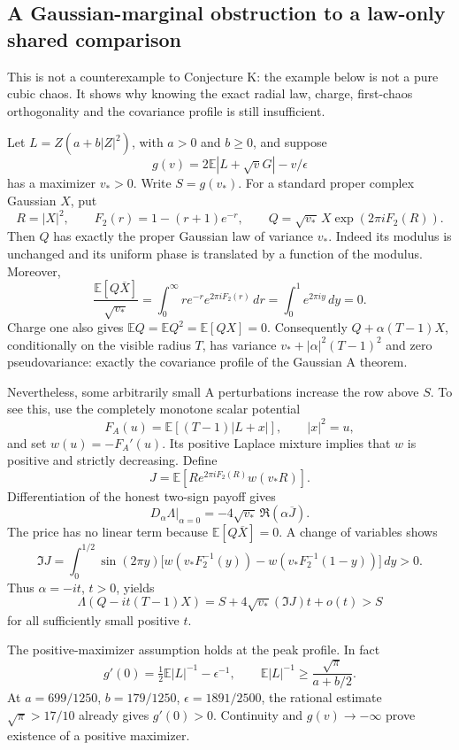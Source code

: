 \subsection{A Gaussian-marginal obstruction to a law-only shared comparison}
\label{sec:gaussian-marginal-shared-obstruction}
This is not a counterexample to Conjecture K: the example below is not a pure cubic chaos. It shows why knowing the exact radial law, charge, first-chaos orthogonality and the covariance profile is still insufficient.

Let $L=Z(a+b|Z|^2)$, with $a>0$ and $b\ge0$, and suppose
\[
g(v)=2\mathbb E|L+\sqrt vG|-v/\epsilon
\]
has a maximizer $v_*>0$. Write $S=g(v_*)$. For a standard proper complex Gaussian $X$, put
\[
R=|X|^2,\qquad F_2(r)=1-(r+1)e^{-r},\qquad
Q=\sqrt{v_*}\,X\exp(2\pi iF_2(R)).
\]
Then $Q$ has exactly the proper Gaussian law of variance $v_*$. Indeed its modulus is unchanged and its uniform phase is translated by a function of the modulus. Moreover,
\[
\frac{\mathbb E[Q\overline X]}{\sqrt{v_*}}
 =\int_0^\infty r e^{-r}e^{2\pi iF_2(r)}\,dr
 =\int_0^1 e^{2\pi iy}\,dy=0.
\]
Charge one also gives $\mathbb EQ=\mathbb EQ^2=\mathbb E[QX]=0$. Consequently $Q+\alpha(T-1)X$, conditionally on the visible radius $T$, has variance $v_*+|\alpha|^2(T-1)^2$ and zero pseudovariance: exactly the covariance profile of the Gaussian A theorem.

Nevertheless, some arbitrarily small A perturbations increase the row above $S$. To see this, use the completely monotone scalar potential
\[
F_A(u)=\mathbb E[(T-1)|L+x|],\qquad |x|^2=u,
\]
and set $w(u)=-F_A'(u)$. Its positive Laplace mixture implies that $w$ is positive and strictly decreasing. Define
\[
J=\mathbb E[R e^{2\pi iF_2(R)}w(v_*R)].
\]
Differentiation of the honest two-sign payoff gives
\[
D_\alpha\Lambda\big|_{\alpha=0}
=-4\sqrt{v_*}\,\Re(\alpha\overline J).
\]
The price has no linear term because $\mathbb E[Q\overline X]=0$. A change of variables shows
\[
\Im J=\int_0^{1/2}\sin(2\pi y)
 \bigl[w(v_*F_2^{-1}(y))-w(v_*F_2^{-1}(1-y))\bigr]\,dy>0.
\]
Thus $\alpha=-it$, $t>0$, yields
\[
\Lambda(Q-it(T-1)X)=S+4\sqrt{v_*}(\Im J)t+o(t)>S
\]
for all sufficiently small positive $t$.

The positive-maximizer assumption holds at the peak profile. In fact
\[
g'(0)=\tfrac12\mathbb E|L|^{-1}-\epsilon^{-1},\qquad
\mathbb E|L|^{-1}\ge\frac{\sqrt\pi}{a+b/2}.
\]
At $a=699/1250$, $b=179/1250$, $\epsilon=1891/2500$, the rational estimate $\sqrt\pi>17/10$ already gives $g'(0)>0$. Continuity and $g(v)\to-\infty$ prove existence of a positive maximizer.

